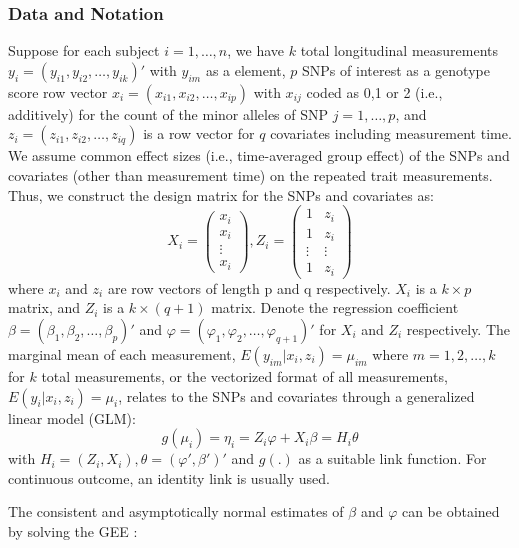 \documentclass[12pt]{article}
\begin{document}
\subsubsection{Data and Notation}
Suppose for each subject $i = 1,\ldots,n$, we have $k$ total longitudinal measurements $y_i = (y_{i1}, y_{i2}, \ldots, y_{ik})'$ with $y_{im}$ as a element, $p$ SNPs of interest as a genotype score row vector $x_i = (x_{i1}, x_{i2}, \ldots, x_{ip})$ with $x_{ij}$ coded as 0,1 or 2 (i.e., additively) for the count of the minor alleles of SNP $j = 1, \ldots, p$, and $z_i = (z_{i1}, z_{i2}, \ldots, z_{iq})$ is a row vector for $q$ covariates including measurement time. We assume common effect sizes (i.e., time-averaged group effect) of the SNPs and covariates (other than measurement time) on the repeated trait measurements. Thus, we construct the design matrix for the SNPs and covariates as:
$$
  X_i = \begin{pmatrix}
          x_{i}\\
          x_{i}\\
          \vdots\\
          x_{i}
          \end{pmatrix} 
  , 
  Z_{i}=\begin{pmatrix}1 & z_{i}\\
          1 & z_{i}\\
          \vdots & \vdots\\
          1 & z_{i}
          \end{pmatrix}
$$
where $x_i$ and $z_i$ are row vectors of length p and q respectively. $X_i$ is a $k \times p$ matrix, and $Z_{i}$ is a $k \times (q+1)$ matrix. Denote the regression coefficient $\beta = (\beta_1, \beta_2, \ldots, \beta_p)'$ and $\varphi = (\varphi_1, \varphi_2, \ldots, \varphi_{q+1})'$ for $X_i$ and $Z_i$ respectively. The marginal mean of each measurement, $E(y_{im}|x_i,z_i) = \mu_{im}$ where $m = 1,2, \ldots, k$ for $k$ total measurements, or the vectorized format of all measurements, $E(y_{i}|x_i,z_i) = \mu_{i}$, relates to the SNPs and covariates through a generalized linear model (GLM):
$$
g(\mu_i) = \eta_i = Z_i \varphi + X_i \beta = H_i \theta
$$
\noindent with $H_i = (Z_i, X_i), \theta = (\varphi', \beta')'$ and $g(.)$ as a suitable link function. For continuous outcome, an identity link is usually used.

The consistent and asymptotically normal estimates of $\beta$ and $\varphi$ can be obtained by solving the GEE \cite{liang1986longitudinal}: 
\end{document}
